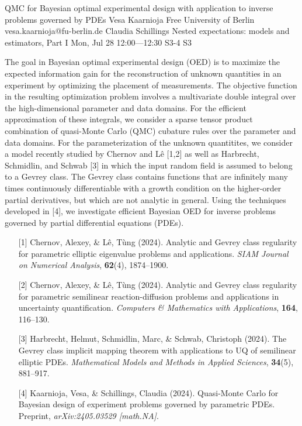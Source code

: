 \begin{talk}
  {QMC for Bayesian optimal experimental design with application to inverse problems governed by PDEs}%
  {Vesa Kaarnioja}%
  {Free University of Berlin}%
  {vesa.kaarnioja@fu-berlin.de}%
  {Claudia Schillings}%
  {Nested expectations: models and estimators, Part I}%
  {Mon, Jul 28 12:00---12:30}%
  {S3-4}%
  {S3}%
    
   
The goal in Bayesian optimal experimental design (OED) is to maximize the expected information gain for the reconstruction of unknown quantities in an experiment by optimizing the placement of measurements. The objective function in the resulting optimization problem involves a multivariate double integral over the high-dimensional parameter and data domains. For the efficient approximation of these integrals, we consider a sparse tensor product combination of quasi-Monte Carlo (QMC) cubature rules over the parameter and data domains. For the parameterization of the unknown quantitites, we consider a model recently studied by Chernov and L\^{e} [1,2] as well as Harbrecht, Schmidlin, and Schwab [3] in which the input random field is assumed to belong to a Gevrey class. The Gevrey class contains functions that are infinitely many times continuously differentiable with a growth condition on the higher-order partial derivatives, but which are not analytic in general. Using the techniques developed in [4], we investigate efficient Bayesian OED for inverse problems governed by partial differential equations (PDEs).
\begin{enumerate}
 \item[{[1]}] Chernov, Alexey, \& L\^{e}, T\`{u}ng (2024). Analytic and Gevrey class regularity for parametric elliptic eigenvalue problems and applications. \emph{SIAM Journal on Numerical Analysis}, \textbf{62}(4), 1874--1900.
 \item[{[2]}] Chernov, Alexey, \& L\^{e}, T\`{u}ng (2024). Analytic and Gevrey class regularity for parametric semilinear reaction-diffusion problems and applications in uncertainty quantification. \emph{Computers \& Mathematics with Applications}, \textbf{164}, 116--130.
 \item[{[3]}] Harbrecht, Helmut, Schmidlin, Marc, \& Schwab, Christoph (2024). The Gevrey class implicit mapping theorem with applications to UQ of semilinear elliptic PDEs. \emph{Mathematical Models and Methods in Applied Sciences}, \textbf{34}(5), 881--917.
 \item[{[4]}] Kaarnioja, Vesa, \& Schillings, Claudia (2024). Quasi-Monte Carlo for Bayesian design of experiment problems governed by parametric PDEs. Preprint, \emph{arXiv:2405.03529 [math.NA]}.
\end{enumerate}

\end{talk}

